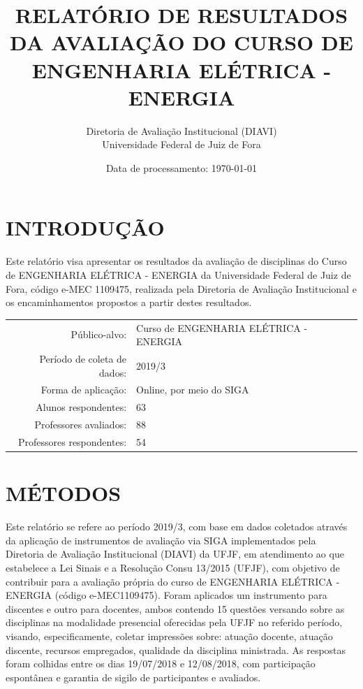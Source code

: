 \documentclass[a4paper,10pt]{article}
\date{Data de processamento: \today}
\begin{document}
\author{Diretoria de Avaliação Institucional (DIAVI) \\ Universidade Federal de Juiz de Fora}

\title{RELATÓRIO DE RESULTADOS DA AVALIAÇÃO DO CURSO DE ENGENHARIA ELÉTRICA - ENERGIA}
\maketitle
\section{INTRODUÇÃO}
Este relatório visa apresentar os resultados da avaliação de disciplinas do Curso     de ENGENHARIA ELÉTRICA - ENERGIA da Universidade Federal de Juiz de Fora, código e-MEC 1109475, realizada pela     Diretoria de Avaliação Institucional e os encaminhamentos propostos a     partir destes resultados.

\begin{center}
\begin{tabularx}{\linewidth}{r|X}

Público-alvo:& Curso de ENGENHARIA ELÉTRICA - ENERGIA\\

Período de coleta de dados:& 2019/3 \\

Forma de aplicação:& Online, por meio do SIGA\\

Alunos respondentes:& 63\\

Professores avaliados:& 88\\

Professores respondentes:& 54\\
\end{tabularx}
\end{center}

\section{MÉTODOS}
Este relatório se refere ao período 2019/3, com base em dados     coletados através da aplicação de instrumentos de avaliação via SIGA     implementados pela Diretoria de Avaliação Institucional (DIAVI) da UFJF, em atendimento     ao que estabelece a Lei Sinais e a Resolução Consu 13/2015 (UFJF),     com objetivo de contribuir para a avaliação própria do curso de ENGENHARIA ELÉTRICA - ENERGIA (código e-MEC1109475). Foram aplicados um instrumento para discentes e outro para docentes, ambos contendo     15 questões versando sobre as disciplinas na modalidade presencial oferecidas pela UFJF no     referido período, visando, especificamente, coletar impressões sobre: atuação docente, atuação discente,     recursos empregados, qualidade da disciplina ministrada.     As respostas foram colhidas entre os dias 19/07/2018 e 12/08/2018, com participação espontânea e garantia de    sigilo de participantes e avaliados.
\end{document}
